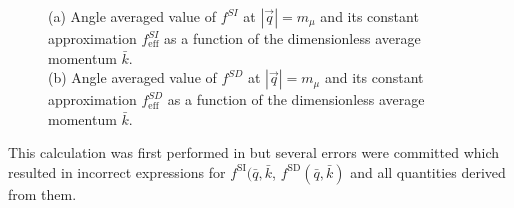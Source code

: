 \documentclass{book}[letterpaper,12pt]
\begin{document}
\begin{figure}
\centering
{}
\hfill
{}
\caption{(a) Angle averaged value of $f^{SI}$ at $|\vec{q}|=m_{\mu}$ and its constant approximation $f_\mathrm{eff}^{SI}$ as a function of the dimensionless average momentum $\bar{k}$. 
\\
(b) Angle averaged value of $f^{SD}$ at $|\vec{q}|=m_{\mu}$ and its constant approximation $f_\mathrm{eff}^{SD}$ as a function of the dimensionless average momentum $\bar{k}$.}
\label{fig:1body_f_functions}
\end{figure}


This calculation was first performed in \cite{2018PhRvC..98a5208B} but several errors were committed which resulted in incorrect expressions for $f^\mathrm{SI}(\bar{q},\bar{k}$, $f^\mathrm{SD}(\bar{q},\bar{k})$ and all quantities derived from them.
\end{document}
